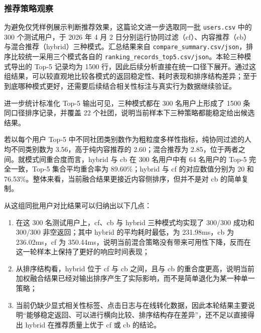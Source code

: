 \subsubsection{推荐策略观察}

为避免仅凭样例展示判断推荐效果，这篇论文进一步选取同一批 \texttt{users.csv} 中的 300 个测试用户，于 2026 年 4 月 2 日分别运行协同过滤（cf）、内容推荐（cb）与混合推荐（hybrid）三种模式。汇总结果来自 \texttt{compare\_summary.csv/json}，排序比较统一采用三个模式各自的 \texttt{ranking\_records\_top5.csv/json}。本轮三种模式导出的 Top-5 记录均为 1500 行，因此后续分析直接在统一口径下展开。通过这组结果，可以较直观地比较各模式的返回稳定性、耗时表现和排序结构差异；至于到底哪种模式更好，还需要后续结合相关性标注与真实行为数据继续验证。

\begin{table}[H]
\centering
\small
\caption{同批 300 个测试用户下的推荐模式对比结果}
\label{tab:recommendation-comparison}
\end{table}

进一步统计标准化 Top-5 输出可见，三种模式都在 300 名用户上形成了 1500 条同口径排序记录，并覆盖 22 个社团，说明当前样本下三种策略都能稳定给出候选结果。

若以每个用户 Top-5 中不同社团类别数作为粗粒度多样性指标，纯协同过滤的人均不同类别数为 3.56，高于纯内容推荐的 2.60；混合推荐为 2.85，位于两者之间。就模式间重合度而言，hybrid 与 cb 在 300 名用户中有 64 名用户的 Top-5 完全一致，Top-5 集合平均重合率为 89.60\%；hybrid 与 cf 的对应数值分别为 20 和 76.53\%。整体来看，当前融合结果更接近内容侧排序，但并不是对 cb 的简单复制。

从这组同批用户对比结果可以归纳出以下几点：
\begin{enumerate}
  \item 在这 300 名测试用户上，cf、cb 与 hybrid 三种模式均实现了 300/300 成功和 300/300 非空返回；其中 hybrid 的平均耗时最低，为 231.98ms，cb 为 236.02ms，cf 为 350.44ms，说明当前混合策略没有带来可用性下降，反而在这一轮样本上保持了更好的响应时间表现；
  \item 从排序结构看，hybrid 位于 cf 与 cb 之间，且与 cb 的重合度更高，说明当前加权融合结果已经对输出排序产生了实际影响，而不是简单退化为某一种单一策略；
  \item 当前仍缺少显式相关性标签、点击日志与在线转化数据，因此本轮结果主要说明“能够稳定返回、可以进行横向比较、排序结构存在差异”，还不足以直接得出 hybrid 在推荐质量上优于 cf 或 cb 的结论。
\end{enumerate}

